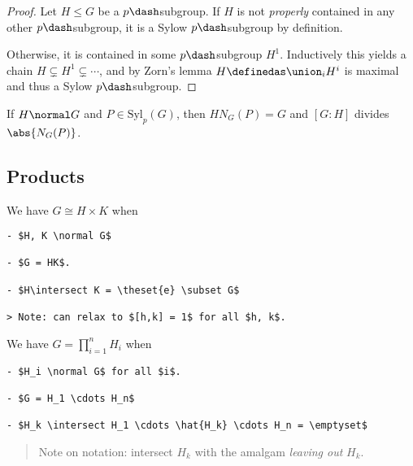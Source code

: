 \begin{proof}

Let \(H \leq G\) be a \(p\dash\)subgroup. If \(H\) is not
\emph{properly} contained in any other \(p\dash\)subgroup, it is a Sylow
\(p\dash\)subgroup by definition.

Otherwise, it is contained in some \(p\dash\)subgroup \(H^1\).
Inductively this yields a chain \(H \subsetneq H^1 \subsetneq \cdots\),
and by Zorn's lemma \(H\definedas \union_i H^i\) is maximal and thus a
Sylow \(p\dash\)subgroup.

\end{proof}

\begin{theorem}

If \(H\normal G\) and \(P \in \mathrm{Syl}_p(G)\), then \(H N_G(P) = G\)
and \([G: H]\) divides \(\abs{N_G(P)}\).

\end{theorem}

\hypertarget{products}{%
\subsection{Products}\label{products}}

\begin{theorem}

We have \(G \cong H \times K\) when

\begin{verbatim}
- $H, K \normal G$

- $G = HK$.

- $H\intersect K = \theset{e} \subset G$

> Note: can relax to $[h,k] = 1$ for all $h, k$.
\end{verbatim}

\end{theorem}

\begin{theorem}

We have \(G = \prod_{i=1}^n H_i\) when

\begin{verbatim}
- $H_i \normal G$ for all $i$.

- $G = H_1 \cdots H_n$

- $H_k \intersect H_1 \cdots \hat{H_k} \cdots H_n = \emptyset$
\end{verbatim}

\begin{quote}
Note on notation: intersect \(H_k\) with the amalgam \emph{leaving out}
\(H_k\).
\end{quote}

\end{theorem}

